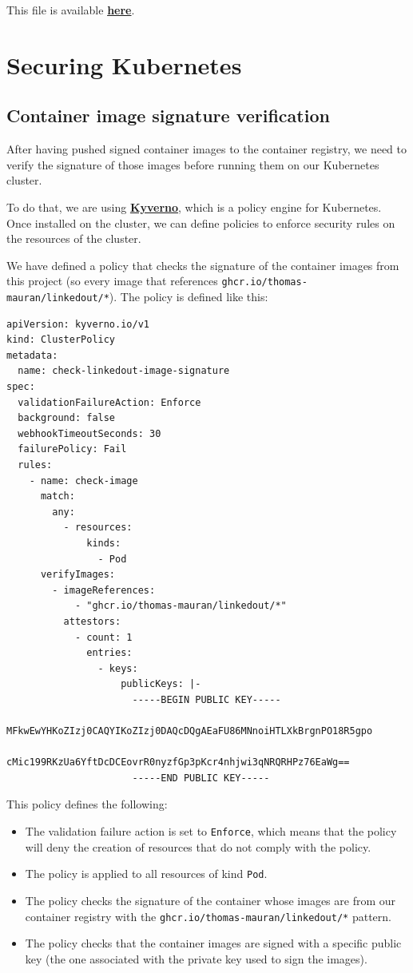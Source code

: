 \documentclass[12pt,x11names]{article}
\begin{document}
This file is available \href{https://github.com/thomas-mauran/LinkedOut/blob/main/backend/Dockerfile}{\textbf{here}}.

\section{Securing Kubernetes}

\subsection{Container image signature verification}

After having pushed signed container images to the container registry, we need to verify
the signature of those images before running them on our Kubernetes cluster.

\medskip
To do that, we are using \href{https://kyverno.io/}{\textbf{Kyverno}}, which is a
policy engine for Kubernetes. Once installed on the cluster, we can define policies to
enforce security rules on the resources of the cluster.

\medskip
We have defined a policy that checks the signature of the container images from this
project (so every image that references \texttt{ghcr.io/thomas-mauran/linkedout/*}). The
policy is defined like this:

\begin{lstlisting}
apiVersion: kyverno.io/v1
kind: ClusterPolicy
metadata:
  name: check-linkedout-image-signature
spec:
  validationFailureAction: Enforce
  background: false
  webhookTimeoutSeconds: 30
  failurePolicy: Fail
  rules:
    - name: check-image
      match:
        any:
          - resources: 
              kinds:
                - Pod
      verifyImages:
        - imageReferences:
            - "ghcr.io/thomas-mauran/linkedout/*"
          attestors:
            - count: 1
              entries:
                - keys:
                    publicKeys: |-
                      -----BEGIN PUBLIC KEY-----
                      MFkwEwYHKoZIzj0CAQYIKoZIzj0DAQcDQgAEaFU86MNnoiHTLXkBrgnPO18R5gpo
                      cMic199RKzUa6YftDcDCEovrR0nyzfGp3pKcr4nhjwi3qNRQRHPz76EaWg==
                      -----END PUBLIC KEY-----
\end{lstlisting}

This policy defines the following:

\begin{itemize}
  \item The validation failure action is set to \texttt{Enforce}, which means that the
  policy will deny the creation of resources that do not comply with the policy.
  \item The policy is applied to all resources of kind \texttt{Pod}.
  \item The policy checks the signature of the container whose images are from our
  container registry with the \texttt{ghcr.io/thomas-mauran/linkedout/*} pattern.
  \item The policy checks that the container images are signed with a specific public
  key (the one associated with the private key used to sign the images).
\end{itemize}
\end{document}
